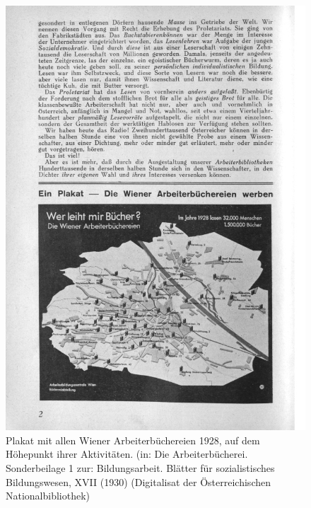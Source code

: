 \documentclass[a4paper,
fontsize=11pt,
oneside,
numbers=noperiodatend,
parskip=half-,
bibliography=totoc,
final
]{scrartcl}
\begin{document}
\begin{figure}
\centering
\includegraphics[width=14 cm]{img/Schuldt05.jpg}
\caption{Plakat mit allen Wiener Arbeiterbüchereien 1928, auf dem
Höhepunkt ihrer Aktivitäten. (in: Die Arbeiterbücherei. Sonderbeilage 1
zur: Bildungsarbeit. Blätter für sozialistisches Bildungswesen, XVII
(1930) (Digitalisat der Österreichischen Nationalbibliothek)}
\end{figure}
\end{document}
